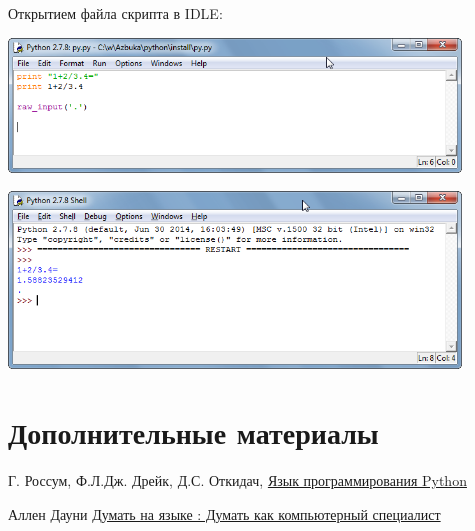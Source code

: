 Открытием файла скрипта в IDLE:
\bigskip




\bigskip
\includegraphics[width=0.9\textwidth]{python/install/049.png}

\includegraphics[width=0.9\textwidth]{python/install/050.png}
\bigskip

\section{Дополнительные материалы}

\cite{pyotkidach} Г. Россум, Ф.Л.Дж. Дрейк, Д.С. Откидач, 
\href{http://rus-linux.net/MyLDP/BOOKS/python.pdf}{Язык программирования Python}

\cite{pythink} Аллен Дауни
\href{https://drive.google.com/file/d/0B0u4WeMjO894Q2hWV1QwOFFQOVk/view?usp=sharing}{Думать
на языке \py: Думать как компьютерный специалист}


